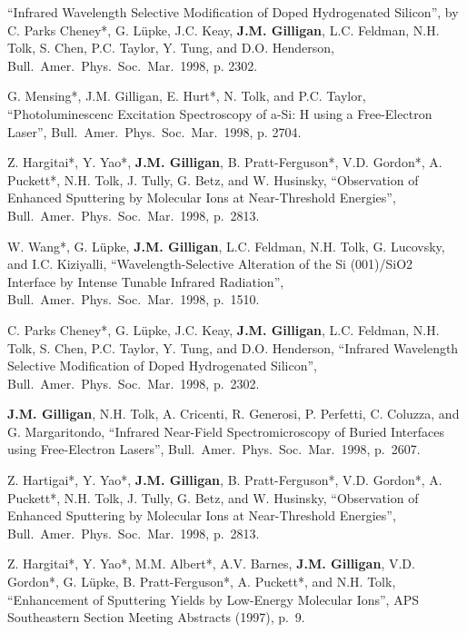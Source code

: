     \item \enquote{Infrared Wavelength Selective Modification of Doped Hydrogenated Silicon},
    by C. Parks Cheney*, G. L{\"u}pke, J.C. Keay, \textbf{J.M. Gilligan}, L.C. Feldman, N.H. Tolk, S. Chen, P.C. Taylor, Y. Tung, and D.O. Henderson,
    Bull.\ Amer.\ Phys.\ Soc.\ Mar.~1998, p. 2302.

\item
  G. Mensing*, J.M. Gilligan, E. Hurt*, N. Tolk, and P.C. Taylor,
  \enquote{Photoluminescenc Excitation Spectroscopy of a-Si: H using a Free-Electron Laser},
Bull.\ Amer.\ Phys.\ Soc.\ Mar.~1998, p. 2704.

\item
  Z. Hargitai*, Y. Yao*, \textbf{J.M. Gilligan}, B. Pratt-Ferguson*, V.D. Gordon*, A. Puckett*, N.H. Tolk, J. Tully, G. Betz, and W. Husinsky,
  \enquote{Observation of Enhanced Sputtering by Molecular Ions at Near-Threshold Energies},
Bull.\ Amer.\ Phys.\ Soc.\ Mar.~1998, p.~2813.

\item
  W. Wang*, G. L{\"u}pke, \textbf{J.M. Gilligan}, L.C. Feldman, N.H. Tolk, G. Lucovsky, and I.C. Kiziyalli,
  \enquote{Wavelength-Selective Alteration of the Si (001)/SiO2 Interface by Intense Tunable Infrared Radiation},
Bull.\ Amer.\ Phys.\ Soc.\ Mar.~1998, p.~1510.

\item
  C. Parks Cheney*, G. L\"upke, J.C. Keay, \textbf{J.M. Gilligan}, L.C. Feldman, N.H. Tolk, S. Chen, P.C. Taylor, Y. Tung, and D.O. Henderson,
  \enquote{Infrared Wavelength Selective Modification of Doped Hydrogenated Silicon},
Bull.\ Amer.\ Phys.\ Soc.\ Mar.~1998, p.~2302.

\item
  \textbf{J.M. Gilligan}, N.H. Tolk, A. Cricenti, R. Generosi, P. Perfetti, C. Coluzza, and G. Margaritondo,
  \enquote{Infrared Near-Field Spectromicroscopy of Buried Interfaces using Free-Electron Lasers},
Bull.\ Amer.\ Phys.\ Soc.\ Mar.~1998, p.~2607.

\item
  Z. Hartigai*, Y. Yao*, \textbf{J.M. Gilligan}, B. Pratt-Ferguson*, V.D. Gordon*, A. Puckett*, N.H. Tolk, J. Tully, G. Betz, and W. Husinsky,
  \enquote{Observation of Enhanced Sputtering by Molecular Ions at Near-Threshold Energies},
Bull.\ Amer.\ Phys.\ Soc.\ Mar.~1998, p.~2813.


\item
  Z. Hargitai*, Y. Yao*, M.M. Albert*, A.V. Barnes, \textbf{J.M. Gilligan}, V.D. Gordon*, G. L{\"u}pke, B. Pratt-Ferguson*, A. Puckett*, and N.H. Tolk,
  \enquote{Enhancement of Sputtering Yields by Low-Energy Molecular Ions},
  APS Southeastern Section Meeting Abstracts (1997), p.~9.

